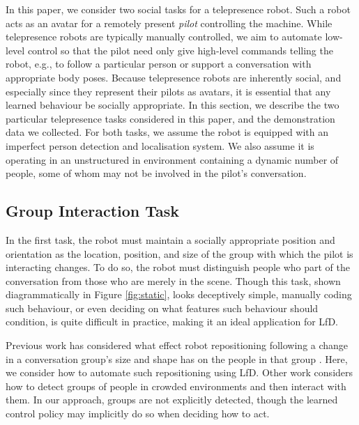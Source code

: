 \documentclass[letterpaper, 10 pt, conference]{ieeeconf}
\begin{document}
In this paper, we consider two social tasks for a telepresence robot.  Such a robot acts as an avatar for a remotely present \emph{pilot} controlling the machine.  While telepresence robots are typically manually controlled, we aim to automate low-level control so that the pilot need only give high-level commands telling the robot, e.g., to follow a particular person or support a conversation with appropriate body poses.  Because telepresence robots are inherently social, and especially since they represent their pilots as avatars, it is essential that any learned behaviour be socially appropriate. In this section, we describe the two particular telepresence tasks considered in this paper, and the demonstration data we collected.  For both tasks, we assume the robot is equipped with an imperfect person detection and localisation system.  We also assume it is operating in an unstructured in environment containing a dynamic number of people, some of whom may not be involved in the pilot's conversation.

\subsection{Group Interaction Task} 

In the first task, the robot must maintain a socially appropriate position and orientation as the location, position, and size of the group with which the pilot is interacting changes.  To do so, the robot must distinguish people who part of the conversation from those who are merely in the scene. Though this task, shown diagrammatically in Figure \ref{fig:static}, looks deceptively simple, manually coding such behaviour, or even deciding on what features such behaviour should condition, is quite difficult in practice, making it an ideal application for LfD.

Previous work has considered what effect robot repositioning following a change in a conversation group's size and shape has on the people in that group \cite{kuzuoka2010reconfiguring,vroon2015dynamics}. Here, we consider how to automate such repositioning using LfD.  Other work considers how to detect groups of people in crowded environments \cite{lau2010multi} and then interact with them.  In our approach, groups are not explicitly detected, though the learned control policy may implicitly do so when deciding how to act.
\end{document}

